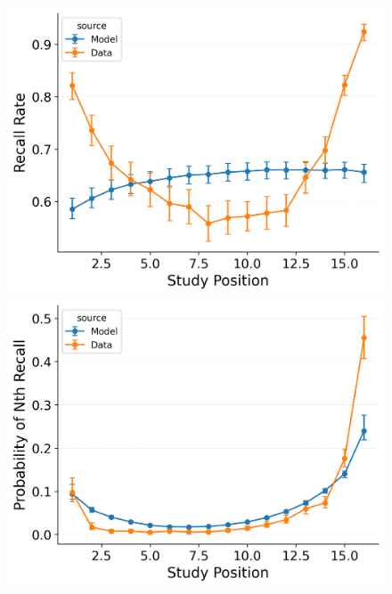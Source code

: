 \documentclass[
  man,
  floatsintext,
  longtable,
  nolmodern,
  notxfonts,
  notimes,
  draftfirst,
  colorlinks=true,linkcolor=blue,citecolor=blue,urlcolor=blue]{apa7}
\begin{document}
\begin{figure}
%
\begin{minipage}{0.33\linewidth}
\includegraphics{figures/HealeyKahana2014_BaseCRU_Fitting_spc.png}\end{minipage}%
\newline
\begin{minipage}{0.33\linewidth}
\includegraphics{figures/HealeyKahana2014_CRU_with_Free_Start_Drift_rate_Fitting_pnr.png}\end{minipage}%
%
\begin{minipage}{0.33\linewidth}

\end{minipage}
\end{figure}
\end{document}
